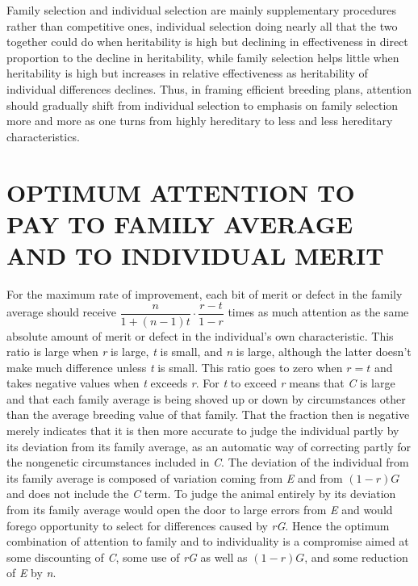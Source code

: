Family selection and individual selection are mainly supplementary
procedures rather than competitive ones, individual selection doing
nearly all that the two together could do when heritability is high but
declining in effectiveness in direct proportion to the decline in heritability,
while family selection helps little when heritability is high but
increases in relative effectiveness as heritability of individual differences
declines. Thus, in framing efficient breeding plans, attention should
gradually shift from individual selection to emphasis on family selection
more and more as one turns from highly hereditary to less and
less hereditary characteristics.

\section*{OPTIMUM ATTENTION TO PAY TO FAMILY AVERAGE AND TO INDIVIDUAL MERIT}

For the maximum rate of improvement, each bit of merit or defect
in the family average should receive $\dfrac{n}{1 + (n - 1)t} \cdot \dfrac{r - t}{1 - r}$
times as much attention as the same absolute amount of merit or defect in the
individual's own characteristic. This ratio is large when \textit{r} is large, \textit{t} is
small, and \textit{n} is large, although the latter doesn't make much difference
unless \textit{t} is small. This ratio goes to zero when $r = t$ and takes negative
values when \textit{t} exceeds \textit{r}. For \textit{t} to exceed \textit{r}
means that \textit{C} is large and that each family average is being shoved up
or down by circumstances other than the average breeding value of that family.
That the fraction then is negative merely indicates that it is then more
accurate to judge the individual partly by its deviation from its family average,
as an automatic way of correcting partly for the nongenetic circumstances included
in \textit{C}. The deviation of the individual from its family average is
composed of variation coming from \textit{E} and from $(1 - r)G$ and does not
include the \textit{C} term. To judge the animal entirely by its deviation from
its family average would open the door to large errors from \textit{E} and
would forego opportunity to select for differences caused by \textit{rG}. Hence
the optimum combination of attention to family and to individuality is
a compromise aimed at some discounting of \textit{C}, some use of \textit{rG} as well as
$(1 - r)G$, and some reduction of \textit{E} by \textit{n}.


